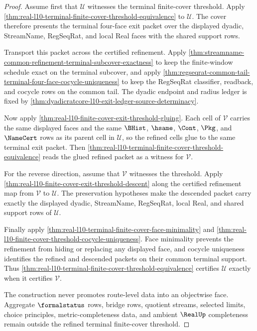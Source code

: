 \begin{proof}
Assume first that $\mathcal U$ witnesses the terminal finite-cover threshold.
Apply \autoref{thm:real-l10-terminal-finite-cover-threshold-equivalence} to
$\mathcal U$. The cover therefore presents the terminal four-face exit packet
over the displayed dyadic, StreamName, RegSeqRat, and local Real faces with
the shared support rows.

Transport this packet across the certified refinement. Apply
\autoref{thm:streamname-common-refinement-terminal-subcover-exactness} to keep
the finite-window schedule exact on the terminal subcover, and apply
\autoref{thm:regseqrat-common-tail-terminal-four-face-cocycle-uniqueness} to
keep the RegSeqRat classifier, readback, and cocycle rows on the common tail.
The dyadic endpoint and radius ledger is fixed by
\autoref{thm:dyadicratcore-l10-exit-ledger-source-determinacy}.

Now apply \autoref{thm:real-l10-finite-cover-exit-threshold-gluing}. Each cell
of $\mathcal V$ carries the same displayed faces and the same $\BHist$,
$\hsame$, $\Cont$, $\Pkg$, and $\NameCert$ rows as its parent cell in
$\mathcal U$, so the refined cells glue to the same terminal exit packet.
Then \autoref{thm:real-l10-terminal-finite-cover-threshold-equivalence} reads
the glued refined packet as a witness for $\mathcal V$.

For the reverse direction, assume that $\mathcal V$ witnesses the threshold.
Apply \autoref{thm:real-l10-finite-cover-exit-threshold-descent} along the
certified refinement map from $\mathcal V$ to $\mathcal U$. The preservation
hypotheses make the descended packet carry exactly the displayed dyadic,
StreamName, RegSeqRat, local Real, and shared support rows of $\mathcal U$.

Finally apply
\autoref{thm:real-l10-terminal-finite-cover-face-minimality} and
\autoref{thm:real-l10-finite-cover-threshold-cocycle-uniqueness}. Face
minimality prevents the refinement from hiding or replacing any displayed
face, and cocycle uniqueness identifies the refined and descended packets on
their common terminal support. Thus
\autoref{thm:real-l10-terminal-finite-cover-threshold-equivalence} certifies
$\mathcal U$ exactly when it certifies $\mathcal V$.

The construction never promotes route-level data into an objectwise face.
Aggregate $\formalstatus$ rows, bridge rows, quotient streams, selected
limits, choice principles, metric-completeness data, and ambient $\RealUp$
completeness remain outside the refined terminal finite-cover threshold.
\end{proof}


